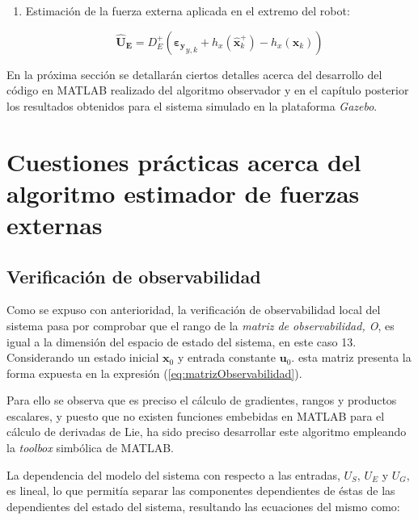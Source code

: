 \begin{enumerate}
\item Estimación de la fuerza externa aplicada en el extremo del robot:

\begin{equation}
	\boldsymbol{\hat{U}_E} = D_E^{+}(\boldsymbol{\varepsilon_y}_{y,k} + h_x(\boldsymbol{\hat{x}}_k^{+}) - h_x(\boldsymbol{x}_k))
\end{equation}

\end{enumerate}

En la próxima sección se detallarán ciertos detalles acerca del desarrollo del código en MATLAB realizado del algoritmo observador y en el capítulo posterior los resultados obtenidos para el sistema simulado en la plataforma \emph{Gazebo}.


\section[Cuestiones prácticas acerca del algoritmo]{Cuestiones prácticas acerca del algoritmo estimador de fuerzas externas}

\subsection[Verificación de observabilidad]{Verificación de observabilidad}

Como se expuso con anterioridad, la verificación de observabilidad local del sistema pasa por comprobar que el rango de la \emph{matriz de observabilidad, O}, es igual a la dimensión del espacio de estado del sistema, en este caso 13. Considerando un estado inicial $\boldsymbol{x}_0$ y entrada constante $\boldsymbol{u}_0$. esta matriz presenta la forma expuesta en la expresión (\ref{eq:matrizObservabilidad}). \par 

Para ello se observa que es preciso el cálculo de gradientes, rangos y productos escalares, y puesto que no existen funciones embebidas en MATLAB para el cálculo de derivadas de Lie, ha sido preciso desarrollar este algoritmo empleando la \emph{toolbox} simbólica de MATLAB. \par 

La dependencia del modelo del sistema con respecto a las entradas, $U_S$, $U_E$ y $U_G$, es lineal, lo que permitía separar las componentes dependientes de éstas de las dependientes del estado del sistema, resultando las ecuaciones del mismo como:

